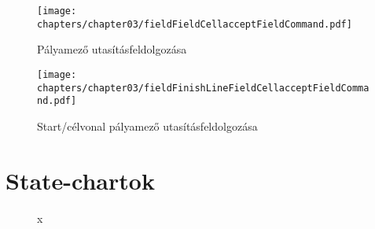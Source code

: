 \begin{figure}[h]
	\begin{center}
		\texttt{[image: chapters/chapter03/fieldFieldCellacceptFieldCommand.pdf]}
		\caption{Pályamező utasításfeldolgozása}
		\label{fig:field.FieldCell.accept}
	\end{center}
\end{figure}

\begin{figure}[h]
	\begin{center}
		\texttt{[image: chapters/chapter03/fieldFinishLineFieldCellacceptFieldCommand.pdf]}
		\caption{Start/célvonal pályamező utasításfeldolgozása}
		\label{fig:field.FinishLineFieldCell.accept}
	\end{center}
\end{figure}


\section{State-chartok}

\begin{figure}[h]
\begin{center}
\caption{x}
\label{fig:example3}
\end{center}
\end{figure}

